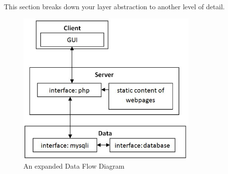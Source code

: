 This section breaks down your layer abstraction to another level of detail.

\begin{figure}[h!]
	\centering
 	\includegraphics[width=0.8\textwidth]{images/LayerBlockDiagramWithSubsystems}
 \caption{An expanded Data Flow Diagram}
\end{figure}
